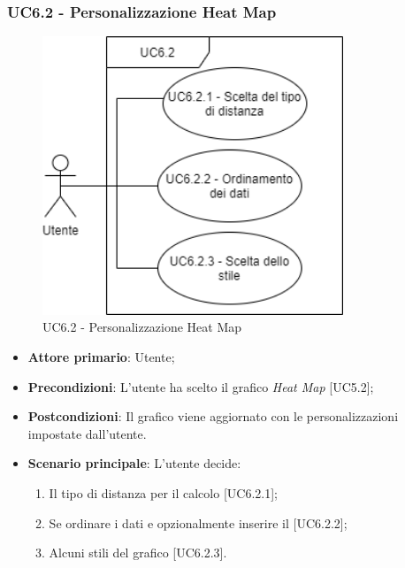 \subsubsection{UC6.2 - Personalizzazione Heat Map}
\begin{figure}[h]
\includegraphics[width=9cm]{Section/Images/UC6.2.png}
\centering
\caption{UC6.2 - Personalizzazione Heat Map}
\end{figure}
\begin{itemize}
	\item \textbf{Attore primario}: Utente;
	
	\item \textbf{Precondizioni}: L'utente ha scelto il grafico \textit{Heat Map} [UC5.2];
	
	\item \textbf{Postcondizioni}: Il grafico viene aggiornato con le personalizzazioni impostate dall'utente.
	
	\item \textbf{Scenario principale}: L'utente decide:
	
\begin{enumerate}
\item Il tipo di distanza per il calcolo [UC6.2.1];
\item Se ordinare i dati e opzionalmente inserire il  [UC6.2.2];
\item Alcuni stili del grafico [UC6.2.3].
\end{enumerate}	
		
\end{itemize}
